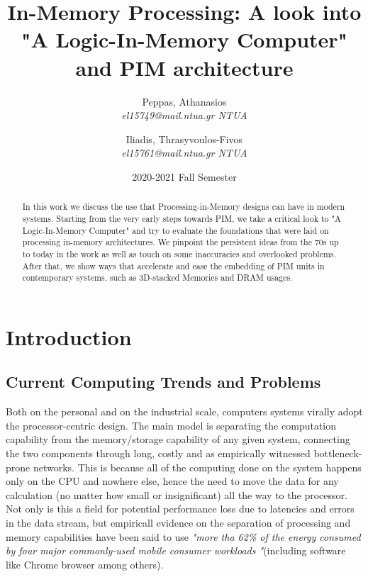 \documentclass[12pt,twocolumn]{IEEEtran}
\title{In-Memory Processing: A look into "A Logic-In-Memory Computer" and PIM architecture}
\date{2020-2021 Fall Semester}
\author{Peppas, Athanasios\\
\textit{el15749@mail.ntua.gr
NTUA}

\and 
Iliadis, Thrasyvoulos-Fivos\\
\textit{el15761@mail.ntua.gr
NTUA}
}
\begin{document}
  \maketitle

\begin{abstract}
In this work we discuss the use that Processing-in-Memory designs can have in modern systems. Starting from the very early steps towards PIM, we take a critical look to "A Logic-In-Memory Computer" and try to evaluate the foundations that were laid on processing in-memory architectures. We pinpoint the persistent ideas from the 70s up to today in the work as well as touch on some inaccuracies and overlooked problems. After that, we show ways that accelerate and ease the embedding of PIM units in contemporary systems, such as 3D-stacked Memories and DRAM usages.
\end{abstract}

\section{Introduction}

\subsection{Current Computing Trends and Problems}
Both on the personal and on the industrial scale, computers systems virally adopt the processor-centric design. The main model is separating the computation capability from the memory/storage capability of any given system, connecting the two components through long, costly and as empirically witnessed bottleneck-prone networks. This is because all of the computing done on the system happens only on the CPU and nowhere else, hence the need to move the data for any calculation (no matter how small or insignificant) all the way to the processor. Not only is this a field for potential performance loss due to latencies and errors in the data stream, but empiricall evidence on the separation of processing and memory capabilities have been said to use \textit{"more tha 62\% of the energy consumed by four major commonly-used mobile consumer workloads "}(including software like Chrome browser among others)\cite{PAPER:1}.
\end{document}
